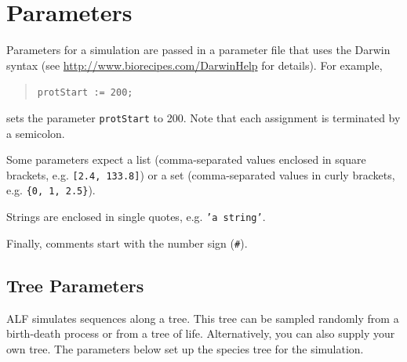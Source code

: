 \documentclass[11pt]{article}
\begin{document}
\section{Parameters}
\label{sec.params}
Parameters for a simulation are passed in a parameter file that uses the Darwin syntax (see \url{http://www.biorecipes.com/DarwinHelp} for details). For example,
\begin{quote}
\texttt{protStart := 200;}
\end{quote}
sets the parameter \texttt{protStart} to 200. Note that each assignment is terminated by a semicolon.

Some parameters expect a list (comma-separated values enclosed in square brackets, e.g. \texttt{[2.4, 133.8]}) or a set (comma-separated values in curly brackets, e.g. \texttt{\{0, 1, 2.5\}}).

Strings are enclosed in single quotes, e.g. \texttt{'a string'}.

Finally, comments start with the number sign (\verb|#|).


\subsection{Tree Parameters}
ALF simulates sequences along a tree. This tree can be sampled randomly from a birth-death process or from a tree of life. Alternatively, you can also supply your own tree. The parameters below set up the species tree for the simulation.
\end{document}
